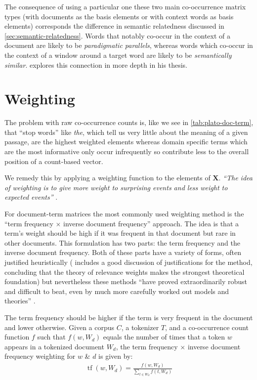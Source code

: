 The consequence of using a particular one these two main co-occurrence matrix types (with documents as the basis elements or with context words as basis elements) corresponds the difference in semantic relatedness discussed in \autoref{sec:semantic-relatedness}. Words that notably co-occur in the context of a document are likely to be \emph{paradigmatic parallels}, whereas words which co-occur in the context of a window around a target word are likely to be \emph{semantically similar}. \textcite{sahlgreen-2006-the-word-space-model} explores this connection in more depth in his thesis.

\section{Weighting}\label{sec:weighting}
The problem with raw co-occurrence counts is, like we see in \autoref{tab:plato-doc-term}, that ``stop words'' like \emph{the}, which tell us very little about the meaning of a given passage, are the highest weighted elements whereas domain specific terms which are the most informative only occur infrequently so contribute less to the overall position of a count-based vector.

We remedy this by applying a weighting function to the elements of $\bm{X}$. \emph{``The idea of weighting is to give more weight to surprising events and less weight to expected events''} \parencite{turney10-from-frequen-to-meanin}.

For document-term matrices the most commonly used weighting method is the ``term frequency $\times$ inverse document frequency'' approach. The idea is that a term's weight should be high if it was frequent in that document but rare in other documents. This formulation has two parts: the term frequency and the inverse document frequency. Both of these parts have a variety of forms, often justified heuristically (\textcite{robertson-2004-understanding-idf} includes a good discussion of justifications for the method, concluding that the theory of relevance weights \parencite{robertson-1976-relevance-weighting} makes the strongest theoretical foundation) but nevertheless these methods ``have proved extraordinarily robust and difficult to beat, even by much more carefully worked out models and theories'' \parencite{robertson-2004-understanding-idf}.

\begin{definition}
  The term frequency should be higher if the term is very frequent in the document and lower otherwise.
  Given a corpus $C$, a tokenizer $T$, and a co-occurrence count function $f$ such that $f(w,W_d)$ equals the number of times that a token $w$ appears in a tokenized document $W_d$, the term frequency $\times$ inverse document frequency weighting for $w$ \& $d$ is given by:
  \begin{align}
    \operatorname{tf}(w,W_d)=\frac{f(w,W_d)}{\sum_{t\in W_d}f(t,W_d)}
  \end{align}
\end{definition}

